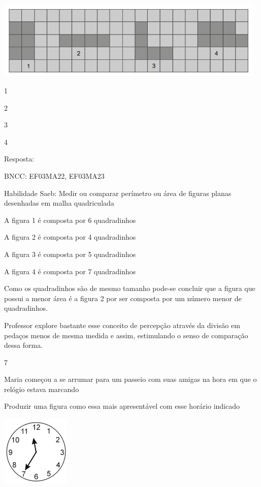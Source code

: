 \begin{escolha}
{\begin{escolha}
{\includegraphics[width=5.12179in,height=1.48342in]{media/image133.png}

\begin{escolha}

\item
  1
\item
  2
\item
  3
\item
  4
\end{escolha}

Resposta:

BNCC: EF03MA22, EF03MA23

Habilidade Saeb: Medir ou comparar perímetro ou área de figuras planas
desenhadas em malha quadriculada

A figura 1 é composta por 6 quadradinhos

A figura 2 é composta por 4 quadradinhos

A figura 3 é composta por 5 quadradinhos

A figura 4 é composta por 7 quadradinhos

Como os quadradinhos são de mesmo tamanho pode-se concluir que a figura
que possui a menor área é a figura 2 por ser composta por um número
menor de quadradinhos.

Professor explore bastante esse conceito de percepção através da divisão
em pedaços menos de mesma medida e assim, estimulando o senso de
comparação dessa forma.

\num{7}

Maria começou a se arrumar para um passeio com suas amigas na hora em
que o relógio estava marcando

Produzir uma figura como essa mais apresentável com esse horário
indicado

\includegraphics[width=1.29487in,height=1.32633in]{media/image134.png}

}
\end{escolha}}
\end{escolha}
